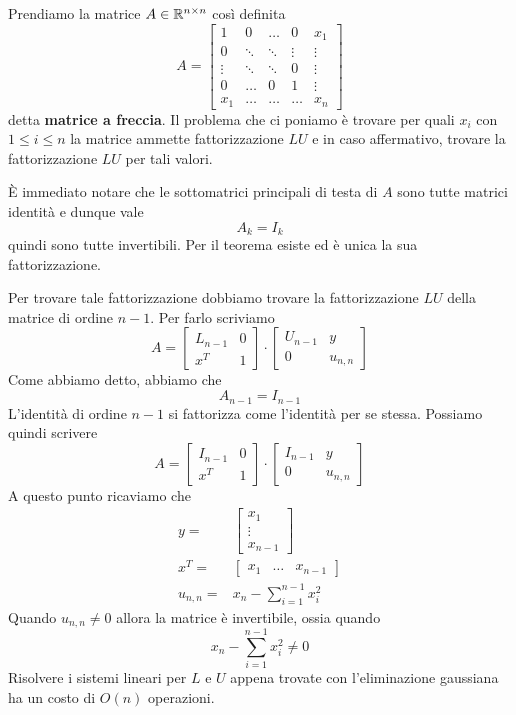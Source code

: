 \begin{example}
	Prendiamo la matrice $A \in \mathbb{R}^{n \times n}$ così definita
	\[
		A = \begin{bmatrix}
			1      & 0      & \dots  & 0      & x_1    \\
			0      & \ddots & \ddots & \vdots & \vdots \\
			\vdots & \ddots & \ddots & 0      & \vdots \\
			0      & \dots  & 0      & 1      & \vdots \\
			x_1    & \dots  & \dots  & \dots  & x_n
		\end{bmatrix}
	\]
	detta \textbf{matrice a freccia}. Il problema che ci poniamo è trovare per quali $x_i$ con $1 \leq i \leq n$
	la matrice ammette fattorizzazione $LU$ e in caso affermativo, trovare la fattorizzazione $LU$ per tali
	valori.

	\`E immediato notare che le sottomatrici principali di testa di $A$ sono tutte matrici identità e dunque vale
	\[ A_k = I_k \]
	quindi sono tutte invertibili. Per il teorema esiste ed è unica la sua fattorizzazione.

	Per trovare tale fattorizzazione dobbiamo trovare la fattorizzazione $LU$ della matrice di ordine $n-1$. Per
	farlo scriviamo
	\[
		A = \begin{bmatrix}
			L_{n-1} & 0 \\
			x^T     & 1
		\end{bmatrix} \cdot
		\begin{bmatrix}
			U_{n-1} & y       \\
			0       & u_{n,n}
		\end{bmatrix}
	\]
	Come abbiamo detto, abbiamo che
	\[ A_{n-1} = I_{n-1} \]
	L'identità di ordine $n-1$ si fattorizza come l'identità per se stessa. Possiamo quindi scrivere
	\[
		A = \begin{bmatrix}
			I_{n-1} & 0 \\
			x^T     & 1
		\end{bmatrix} \cdot
		\begin{bmatrix}
			I_{n-1} & y       \\
			0       & u_{n,n}
		\end{bmatrix}
	\]
	A questo punto ricaviamo che
	\begin{align*}
		y =       & \begin{bmatrix} x_1 \\ \vdots \\ x_{n-1} \end{bmatrix} \\
		x^T =     & \begin{bmatrix} x_1 & \dots & x_{n-1} \end{bmatrix}    \\
		u_{n,n} = & x_n - \sum_{i=1}^{n-1} x_i^2
	\end{align*}
	Quando $u_{n,n} \neq 0$ allora la matrice è invertibile, ossia quando
	\[ x_n - \sum_{i=1}^{n-1} x_i^2 \neq 0 \]
	Risolvere i sistemi lineari per $L$ e $U$ appena trovate con l'eliminazione gaussiana ha un costo di $O(n)$
	operazioni.
\end{example}

